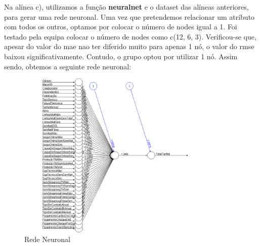 Na alínea c), utilizamos a função \textbf{neuralnet} e o dataset das alíneas anteriores, para gerar uma rede neuronal. Uma vez que pretendemos relacionar um atributo com todos os outros, optamos por colocar o número de nodes igual a 1. Foi testado pela equipa colocar o número de nodes como c(12, 6, 3). Verificou-se que, apesar do valor do mae nao ter diferido muito para apenas 1 nó, o valor do rmse baixou significativamente. Contudo, o grupo optou por utilizar 1 nó. Assim sendo, obtemos a seguinte rede neuronal:

\begin{figure}[htbp]
\centerline{\includegraphics[width=9.5cm]{images/5C_REDE_NEURONAL.JPG}}
\caption{Rede Neuronal}
\label{5C_REDE_NEURONAL}
\end{figure}